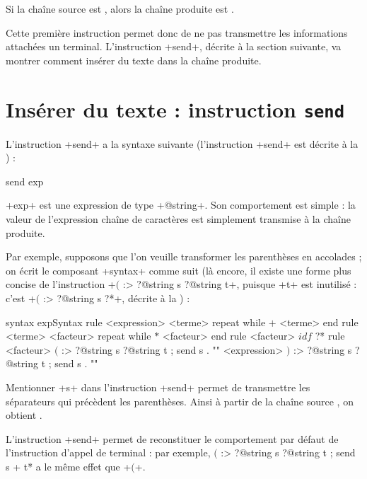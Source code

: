 Si la chaîne source est , alors la chaîne produite est .

Cette première instruction permet donc de ne pas transmettre les informations attachées un terminal. L'instruction \ggs+send+, décrite à la section suivante, va montrer comment insérer du texte dans la chaîne produite.










\section{Insérer du texte : instruction \texttt{send}}

L'instruction \ggs+send+ a la syntaxe suivante (l'instruction \ggs+send+ est décrite à la ) :

\begin{galgas}
send exp
\end{galgas}

\ggs+exp+ est une expression de type \ggs+@string+. Son comportement est simple : la valeur de l'expression chaîne de caractères est simplement transmise à la chaîne produite.

Par exemple, supposons que l'on veuille transformer les parenthèses en accolades ; on écrit le composant \ggs+syntax+ comme suit (là encore, il existe une forme plus concise de l'instruction \ggs+$($ :> ?@string s ?@string t+, puisque \ggs+t+ est inutilisé : c'est \ggs+$($ :> ?@string s ?*+, décrite  à la ) :
\begin{galgas}
syntax expSyntax {
  rule <expression> {
    <terme>
    repeat while $+$ <terme> end
  }
  rule <terme> {
    <facteur>
    repeat while $*$ <facteur> end
  }
  rule <facteur> {
    $idf$ ?*
  }
  rule <facteur> {
    $($ :> ?@string s ?@string t ; send s . "{"
    <expression>
    $)$ :> ?@string s ?@string t ; send s . "}"
  }
}
\end{galgas}

Mentionner \ggs+s+ dans l'instruction \ggs+send+ permet de transmettre les séparateurs qui précèdent les parenthèses. Ainsi à partir de la chaîne source , on obtient .


L'instruction \ggs+send+ permet de reconstituer le comportement par défaut de l'instruction d'appel de terminal : par exemple, \ggs*$($ :> ?@string s ?@string t ; send s + t* a le même effet que \ggs+$($+.


